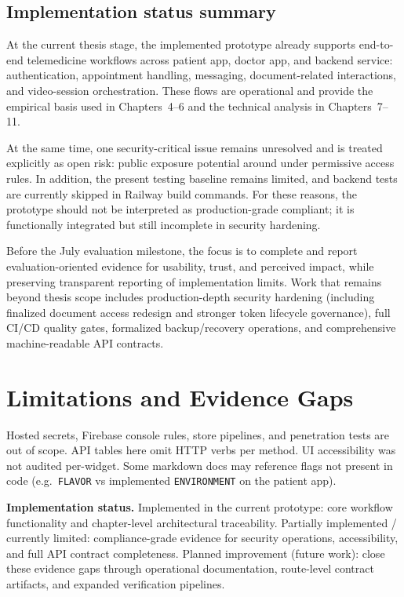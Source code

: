 \documentclass[11pt,a4paper,twoside,openany,headings=normal]{scrreprt}
\newcommand{\codepath}[1]{\texttt{\detokenize{#1}}}
\let\path\codepath
\begin{document}
\section{Implementation status summary}

At the current thesis stage, the implemented prototype already supports end-to-end telemedicine workflows across patient app, doctor app, and backend service: authentication, appointment handling, messaging, document-related interactions, and video-session orchestration. These flows are operational and provide the empirical basis used in Chapters~4--6 and the technical analysis in Chapters~7--11.

At the same time, one security-critical issue remains unresolved and is treated explicitly as open risk: public exposure potential around \path{/patientdocuments/**} under permissive access rules. In addition, the present testing baseline remains limited, and backend tests are currently skipped in Railway build commands. For these reasons, the prototype should not be interpreted as production-grade compliant; it is functionally integrated but still incomplete in security hardening.

Before the July evaluation milestone, the focus is to complete and report evaluation-oriented evidence for usability, trust, and perceived impact, while preserving transparent reporting of implementation limits. Work that remains beyond thesis scope includes production-depth security hardening (including finalized document access redesign and stronger token lifecycle governance), full CI/CD quality gates, formalized backup/recovery operations, and comprehensive machine-readable API contracts.

\chapter{Limitations and Evidence Gaps}

Hosted secrets, Firebase console rules, store pipelines, and penetration tests are out of scope. API tables here omit HTTP verbs per method. UI accessibility was not audited per-widget. Some markdown docs may reference flags not present in code (e.g.\ \texttt{FLAVOR} vs implemented \texttt{ENVIRONMENT} on the patient app).

\textbf{Implementation status.} Implemented in the current prototype: core workflow functionality and chapter-level architectural traceability. Partially implemented / currently limited: compliance-grade evidence for security operations, accessibility, and full API contract completeness. Planned improvement (future work): close these evidence gaps through operational documentation, route-level contract artifacts, and expanded verification pipelines.
\end{document}
